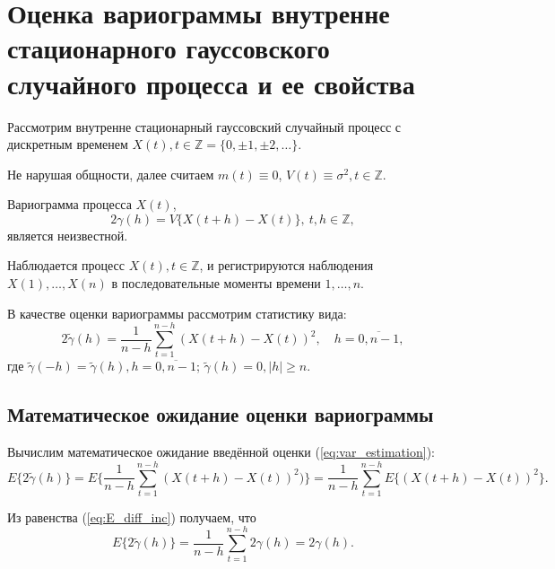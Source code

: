 \newpage

\chapter{Оценка вариограммы внутренне стационарного гауссовского случайного процесса и ее свойства}
\label{c:variogram_estimation}

Рассмотрим внутренне стационарный гауссовский случайный процесс с дискретным временем $ X(t), t \in \mathbb{Z} = \{ 0, \pm 1, \pm 2, \dots \} $.

Не нарушая общности, далее считаем $ m(t) \equiv 0 $, $ V(t) \equiv \sigma^2 , t \in \mathbb{Z}$.

Вариограмма процесса $ X(t) $,
\begin{equation*}
	2 \gamma(h) = V \{ X(t + h) - X(t) \}, ~ t,h \in \mathbb{Z},
\end{equation*}
является неизвестной.

Наблюдается процесс $ X(t), t \in \mathbb{Z} $, и регистрируются наблюдения $ X(1), \dots, X(n) $ в последовательные моменты времени $ 1, \dots, n $.

В качестве оценки вариограммы рассмотрим статистику вида:
\begin{equation}
\label{eq:var_estimation}
	2 \tilde{\gamma}(h) = \frac{1}{n - h} \sum_{t = 1}^{n - h}(X(t + h) - X(t))^2, \quad h = \overline{0, n - 1},
\end{equation}
где $ \tilde{\gamma}(-h) = \tilde{\gamma}(h), h = \overline{0, n - 1}$; $ \tilde{\gamma}(h) = 0, \vert h \vert \ge n $.

\section{Математическое ожидание оценки вариограммы} %
\label{sec:variogram_expected}

Вычислим математическое ожидание введённой оценки (\ref{eq:var_estimation}):
\begin{equation*}
	E \{ 2 \tilde{\gamma}(h) \} = E \{ \frac{1}{n - h} \sum_{t = 1}^{n - h}(X(t + h) - X(t))^2) \} = \frac{1}{n - h} \sum_{t = 1}^{n - h} E \{ (X(t + h) - X(t))^2 \}.
\end{equation*}

Из равенства (\ref{eq:E_diff_inc}) получаем, что
\begin{equation*}
	E \{ 2 \tilde{\gamma}(h) \} = \frac{1}{n - h} \sum_{t = 1}^{n - h} 2 \gamma(h) = 2 \gamma(h).
\end{equation*}


